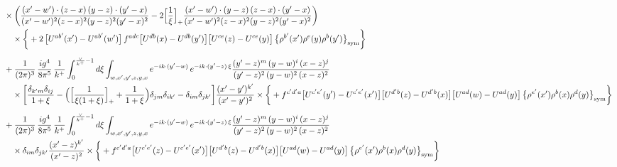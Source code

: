 \documentclass[10pt]{article}
\numberwithin{equation}{section}
\begin{document}
\begin{align}
&\times\bigg(\frac{(x^{\prime}-w^{\prime})\cdot(z-x)\,(y-z)\cdot(y^{\prime}-x)}{(x^{\prime}-w^{\prime})^{2}(z-x)^{2}(y-z)^{2}(y^{\prime}-x)^{2}}-2\Big[\frac{1}{\xi}\Big]_{+}\frac{(x^{\prime}-w^{\prime})\cdot(y-z)\,(z-x)\cdot(y^{\prime}-x)}{(x^{\prime}-w^{\prime})^{2}(z-x)^{2}(y-z)^{2}(y^{\prime}-x)^{2}}\bigg)\notag\\
&\quad\times\bigg\{+2\,\big[U^{ab^{\prime}}(x^{\prime})-U^{ab^{\prime}}(w^{\prime})\big]\,f^{adc}\big[U^{db}(x)-U^{db}(y^{\prime})\big]\big[U^{ce}(z)-U^{ce}(y)\big]\,\big\{\rho^{b^{\prime}}(x^{\prime})\rho^{e}(y)\rho^{b}(y^{\prime})\big\}_{\rm sym}\bigg\}\notag\\[6pt]
&+\frac{1}{(2\pi)^{3}}\,\frac{ig^{4}}{8\pi^{5}}\,\frac{1}{k^{+}}\int_{0}^{\frac{\vee}{k^{+}}-1}d\xi\int_{w,x^{\prime},y^{\prime},z,y,x}e^{-ik\cdot(y^{\prime}-w)}\,e^{-ik\cdot(y^{\prime}-z)\,\xi}\frac{(y^{\prime}-z)^{m}\,(y-w)^{i}\,(x-z)^{j}}{(y^{\prime}-z)^{2}\,(y-w)^{2}\,(x-z)^{2}}\notag\\
&\quad\times\bigg[\frac{\delta_{k^{\prime}m}\delta_{ij}}{1+\xi}-\Big(\Big[\frac{1}{\xi(1+\xi)}\Big]_{+}+\frac{1}{1+\xi}\Big)\delta_{jm}\delta_{ik^{\prime}}-\delta_{im}\delta_{jk^{\prime}}\bigg]\frac{(x^{\prime}-y^{\prime})^{k^{\prime}}}{(x^{\prime}-y^{\prime})^{2}}\times\bigg\{+f^{c^{\prime}d^{\prime}a}\big[U^{c^{\prime}e^{\prime}}(y^{\prime})-U^{c^{\prime}e^{\prime}}(x^{\prime})\big]\big[U^{d^{\prime}b}(z)-U^{d^{\prime}b}(x)\big]\big[U^{ad}(w)-U^{ad}(y)\big]\,\big\{\rho^{e^{\prime}}(x^{\prime})\rho^{b}(x)\rho^{d}(y)\big\}_{\rm sym}\bigg\}\notag\\[6pt]
&+\frac{1}{(2\pi)^{3}}\,\frac{ig^{4}}{8\pi^{5}}\,\frac{1}{k^{+}}\int_{0}^{\frac{\vee}{k^{+}}-1}d\xi\int_{w,x^{\prime},y^{\prime},z,y,x}e^{-ik\cdot(y^{\prime}-w)}\,e^{-ik\cdot(y^{\prime}-z)\,\xi}\frac{(y^{\prime}-z)^{m}\,(y-w)^{i}\,(x-z)^{j}}{(y^{\prime}-z)^{2}\,(y-w)^{2}\,(x-z)^{2}}\notag\\
&\quad\times\delta_{im}\delta_{jk^{\prime}}\frac{(x^{\prime}-z)^{k^{\prime}}}{(x^{\prime}-z)^{2}}\times\bigg\{+f^{c^{\prime}d^{\prime}a}\big[U^{c^{\prime}e^{\prime}}(z)-U^{c^{\prime}e^{\prime}}(x^{\prime})\big]\big[U^{d^{\prime}b}(z)-U^{d^{\prime}b}(x)\big]\big[U^{ad}(w)-U^{ad}(y)\big]\,\big\{\rho^{e^{\prime}}(x^{\prime})\rho^{b}(x)\rho^{d}(y)\big\}_{\rm sym}\bigg\}
\end{align}
\end{document}

